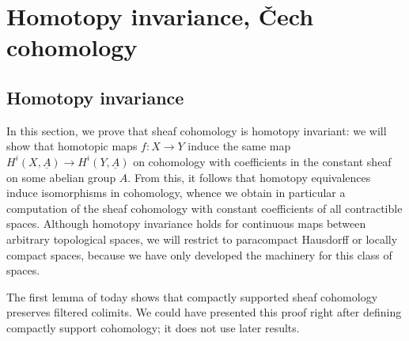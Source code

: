 \chapter{Homotopy invariance, Čech cohomology}
\label{lecture:16}

\section{Homotopy invariance}
\noindent
In this section, we prove that sheaf cohomology is homotopy invariant: we will show that homotopic maps \(f\colon X\to Y\) induce the same map \(H^i(X,\underline{A})\to H^i(Y,\underline{A})\) on cohomology with coefficients in the constant sheaf on some abelian group \(A\).
From this, it follows that homotopy equivalences induce isomorphisms in cohomology, whence we obtain in particular a computation of the sheaf cohomology with constant coefficients of all contractible spaces.
Although homotopy invariance holds for continuous maps between arbitrary topological spaces, we will restrict to paracompact Hausdorff or locally compact spaces, because we have only developed the machinery for this class of spaces.

The first lemma of today shows that compactly supported sheaf cohomology preserves filtered colimits.
We could have presented this proof right after defining compactly support cohomology; it does not use later results.


